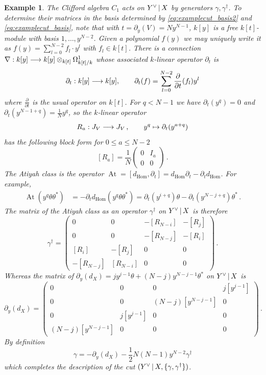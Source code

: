 \documentclass[english,letter paper,12pt,leqno]{article}
\theoremstyle{example}
\newtheorem{example}[theorem]{Example}
\numberwithin{equation}{section}
\def\Hom{\operatorname{Hom}}
\DeclareMathOperator{\At}{At}
\begin{document}
\begin{example}
The Clifford algebra $C_1$ acts on $Y^{\vee} \,|\, X$ by generators $\gamma, \gamma^\dagger$. To determine their matrices in the basis determined by \eqref{eq:examplecut_basis2} and \eqref{eq:examplecut_basis}, note that with $t = \partial_y(V) = N y^{N-1}$, $k[y]$ is a free $k[t]$-module with basis $1, \ldots, y^{N-2}$. Given a polynomial $f(y)$ we may uniquely write it as $f(y) = \sum_{l = 0}^{N-2} f_l \cdot y^l$ with $f_l \in k[t]$. There is a connection $\nabla: k[y] \longrightarrow k[y] \otimes_{k[t]} \Omega^1_{k[t]/k}$ whose associated $k$-linear operator $\partial_t$ is
\[
\partial_t: k[y] \longrightarrow k[y], \qquad \partial_t(f) = \sum_{l = 0}^{N-2} \frac{\partial}{\partial t}( f_l ) y^l
\]
where $\frac{\partial}{\partial t}$ is the usual operator on $k[t]$. For $q < N - 1$ we have $\partial_t(y^q) = 0$ and $\partial_t(y^{N-1+q}) = \frac{1}{N} y^q$, so the $k$-linear operator
\[
R_a: J_V \longrightarrow J_V \,, \qquad y^q \mapsto \partial_t( y^{a+q} )
\]
has the following block form for $0 \le a \le N - 2$
\[
[R_a] = \frac{1}{N} \begin{pmatrix} 0 & I_{a} \\ 0 & 0 \end{pmatrix}\,.
\]
The Atiyah class is the operator $\At = [d_{\Hom}, \partial_t] = d_{\Hom} \partial_t - \partial_t d_{\Hom}$. For example,
\begin{align*}
\At( y^q \theta \theta^* ) &= - \partial_t d_{\Hom}( y^q \theta \theta^* ) = \partial_t( y^{i+q} ) \theta - \partial_t( y^{N-j+q} ) \theta^*\,.
\end{align*}
The matrix of the Atiyah class as an operator $\gamma^\dagger$ on $Y^{\vee} \,|\, X$ is therefore
\begin{equation}\label{eq:aityah_class_hom_example}
\gamma^\dagger = \begin{pmatrix} 0 & 0 & -[R_{N-i}] & -[R_{j}] \\ 
0 & 0 & -[R_{N-j}] & -[R_{i}] \\
[R_i] & -[R_j] & 0 & 0 \\
-[R_{N-j}] & [R_{N-i}] & 0 & 0 \end{pmatrix}\,.
\end{equation}
Whereas the matrix of $\partial_{y}(d_X) = j y^{j-1} \theta + (N-j) y^{N-j-1} \theta^*$ on $Y^{\vee} \,|\, X$ is
\[
\partial_y(d_X) = \begin{pmatrix} 0 & 0 & 0 & j [y^{j-1}] \\
0 & 0 & (N-j) [y^{N-j-1}] & 0\\
0 & j [y^{j-1}] & 0 & 0\\
(N-j) [y^{N-j-1}] & 0 & 0 & 0\end{pmatrix}\,.
\]
By definition
\[
\gamma = - \partial_y(d_X) - \frac{1}{2} N (N-1) y^{N-2} \gamma^\dagger
\]
which completes the description of the cut $( Y^{\vee} \,|\, X, \{ \gamma, \gamma^\dagger \} )$. %
\end{example}
\end{document}
